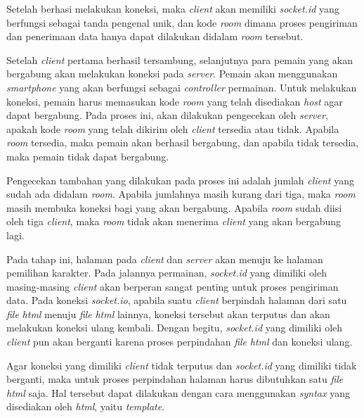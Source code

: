 Setelah berhasi melakukan koneksi, maka \textit{client} akan memiliki \textit{socket.id} yang berfungsi sebagai tanda pengenal unik, dan kode \textit{room} dimana proses pengiriman dan penerimaan data hanya dapat dilakukan didalam \textit{room} tersebut. 

Setelah \textit{client} pertama berhasil tersambung, selanjutnya para pemain yang akan bergabung akan melakukan koneksi pada \textit{server}. Pemain akan menggunakan \textit{smartphone} yang akan berfungsi sebagai \textit{controller} permainan. Untuk melakukan koneksi, pemain harus memasukan kode \textit{room} yang telah disediakan \textit{host} agar dapat bergabung. Pada proses ini, akan dilakukan pengecekan oleh \textit{server}, apakah kode \textit{room} yang telah dikirim oleh \textit{client} tersedia atau tidak. Apabila \textit{room} tersedia, maka pemain akan berhasil bergabung, dan apabila tidak tersedia, maka pemain tidak dapat bergabung.

Pengecekan tambahan yang dilakukan pada proses ini adalah jumlah \textit{client} yang sudah ada didalam \textit{room}. Apabila jumlahnya masih kurang dari tiga, maka \textit{room} masih membuka koneksi bagi yang akan bergabung. Apabila \textit{room} sudah diisi oleh tiga \textit{client}, maka \textit{room} tidak akan menerima \textit{client} yang akan bergabung lagi.


Pada tahap ini, halaman pada \textit{client} dan \textit{server} akan menuju ke halaman pemilihan karakter. Pada jalannya permainan, \textit{socket.id} yang dimiliki oleh masing-masing \textit{client} akan berperan sangat penting untuk proses pengiriman data. Pada koneksi \textit{socket.io}, apabila suatu \textit{client} berpindah halaman dari satu \textit{file} \textit{html} menuju \textit{file} \textit{html} lainnya, koneksi tersebut akan terputus dan akan melakukan koneksi ulang kembali. Dengan begitu, \textit{socket.id} yang dimiliki oleh \textit{client} pun akan berganti karena proses perpindahan \textit{file} \textit{html} dan koneksi ulang. 

Agar koneksi yang dimiliki \textit{client} tidak terputus dan \textit{socket.id} yang dimiliki tidak berganti, maka untuk proses perpindahan halaman harus dibutuhkan satu \textit{file} \textit{html} saja. Hal tersebut dapat dilakukan dengan cara menggunakan \textit{syntax} yang disediakan oleh \textit{html}, yaitu \textit{template}. 


